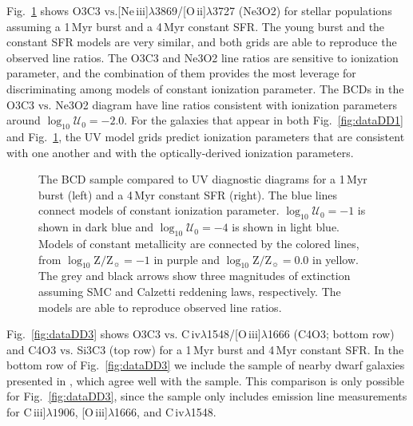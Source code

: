 \documentclass[preprint2]{aastex61}
\newcommand{\oiii}{[O\,{\sc iii}]\xspace}
\newcommand{\oii}{[O\,{\sc ii}]\xspace}
\newcommand{\neiii}{[Ne\,{\sc iii}]\xspace}
\newcommand{\civ}{C\,{\sc iv}\xspace}
\newcommand{\ciii}{C\,{\sc iii}]\xspace}
\newcommand\vs{\ensuremath{\mathrm{vs.}}\xspace}
\newcommand{\Myr}{$\,$Myr\xspace}
\newcommand{\logten}{\ensuremath{\log_{10}}}
\newcommand{\logZeq}[1]{\ensuremath{\logten \mathrm{Z}/\mathrm{Z}_{\sun} = #1}}
\newcommand{\logUeq}[1]{\ensuremath{\logten \mathcal{U}_0 = #1}}
\begin{document}
Fig.~\ref{fig:dataDD2} shows O3C3 \vs \neiii$\lambda$3869/\oii$\lambda$3727 (Ne3O2) for stellar populations assuming a 1\Myr burst and a 4\Myr constant SFR. The young burst and the constant SFR models are very similar, and both grids are able to reproduce the observed line ratios. The O3C3 and Ne3O2 line ratios are sensitive to ionization parameter, and the combination of them provides the most leverage for discriminating among models of constant ionization parameter. The BCDs in the O3C3 \vs Ne3O2 diagram have line ratios consistent with ionization parameters around \logUeq{-2.0}. For the galaxies that appear in both Fig.~\ref{fig:dataDD1} and Fig.~\ref{fig:dataDD2}, the UV model grids predict ionization parameters that are consistent with one another and with the optically-derived ionization parameters.

\begin{figure}
  \begin{center}
    \caption{The \citet{Berg+2016} BCD sample compared to UV diagnostic diagrams for a 1\Myr burst (left) and a 4\Myr constant SFR (right). The blue lines connect models of constant ionization parameter. \logUeq{-1} is shown in dark blue and \logUeq{-4} is shown in light blue. Models of constant metallicity are connected by the colored lines, from \logZeq{-1} in purple and \logZeq{0.0} in yellow. The grey and black arrows show three magnitudes of extinction assuming SMC and Calzetti reddening laws, respectively. The models are able to reproduce observed line ratios.}
    \label{fig:dataDD2}
  \end{center}
\end{figure}

Fig.~\ref{fig:dataDD3} shows O3C3 \vs \civ$\lambda$1548/\oiii$\lambda$1666 (C4O3; bottom row) and C4O3 \vs Si3C3 (top row) for a 1\Myr burst and 4\Myr constant SFR. In the bottom row of Fig.~\ref{fig:dataDD3} we include the sample of nearby dwarf galaxies presented in \citet{Senchyna+2017}, which agree well with the \citet{Berg+2016} sample. This comparison is only possible for Fig.~\ref{fig:dataDD3}, since the \citet{Senchyna+2017} sample only includes emission line measurements for \ciii$\lambda1906$, \oiii$\lambda$1666, and \civ$\lambda$1548.
\end{document}
